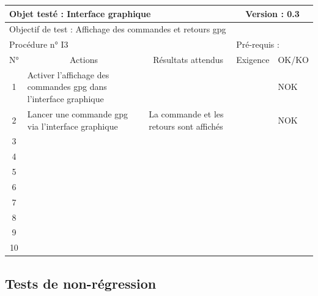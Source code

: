 \documentclass{../res/univ-projet}
\begin{document}
\begin{center}
    \begin{tabular}{|c|p{5cm}|p{5cm}|p{1.5cm}|p{1.5cm}|}
      \hline
      \multicolumn{3}{|l|}{Objet testé : Interface graphique} & \multicolumn{2}{c|}{Version : 0.3}\\ \hline
      \multicolumn{5}{|l|}{Objectif de test : Affichage des commandes et retours gpg}\\ \hline
      \multicolumn{3}{|l|}{Procédure n° I3} & \multicolumn{2}{p{3cm}|}{Pré-requis : }\\ \hline
      \multicolumn{1}{|c|}{N°} & \multicolumn{1}{c|}{Actions} & \multicolumn{1}{c|}{Résultats attendus} & 
      \multicolumn{1}{c|}{Exigence} & \multicolumn{1}{c|}{OK/KO}\\ \hline
      1 & Activer l'affichage des commandes gpg dans l'interface graphique &  &  & NOK \\
      2 & Lancer une commande gpg via l'interface graphique & La commande et les retours sont affichés &  & NOK \\
      3 &  &  &  & \\ 
      4 &  &  &  & \\
      5 &  &  &  & \\
      6 &  &  &  & \\
      7 &  &  &  & \\
      8 &  &  &  & \\
      9 &  &  &  & \\
      10 &  &  &  &\\ 
  \hline
    \end{tabular}
    \vskip 2.2cm

\subsection{Tests de non-régression}


\end{center}
\end{document}
